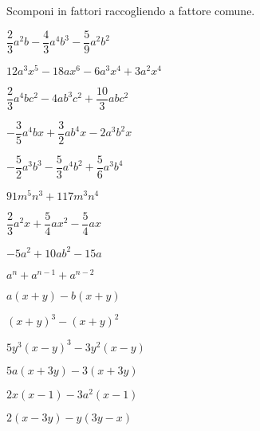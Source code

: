 \begin{esercizio}
\label{ese:div.011}
Scomponi in fattori raccogliendo a fattore comune.
\begin{multicols}{2}
\begin{enumeratea}
 \item $\dfrac{2}{3}a^{2}b-\dfrac{4}{3}a^{4}b^{3}-\dfrac{5}{9}a^{2}b^{2}$
 \item $12a^{3}x^{5}-18ax^{6}-6a^{3}x^{4}+3a^{2}x^{4}$
 \item $\dfrac{2}{3}a^{4}bc^{2}-4ab^{3}c^{2}+\dfrac{10}{3}abc^{2}$
 \item $-{\dfrac{3}{5}}a^{4}bx+\dfrac{3}{2}ab^{4}x-2a^{3}b^{2}x$
 \item $-{\dfrac{5}{2}}a^{3}b^{3}-\dfrac{5}{3}a^{4}b^{2}+\dfrac{5}{6}a^{3}b^{4}$
 \item $91m^{5}n^{3}+117m^{3}n^{4}$
 \item $\dfrac{2}{3}a^{2}x+\dfrac{5}{4}ax^{2}-\dfrac{5}{4}ax$
 \item $-5a^{2}+10ab^{2}-15a$
 \item $a^{n}+a^{n-1}+a^{n-2}$
 \item $a(x+y)-b(x+y)$
 \item $(x+y)^{3}-(x+y)^{2}$
 \item $5y^{3}(x-y)^{3}-3y^{2}(x-y)$
 \item $5a(x+3y)-3(x+3y)$
 \item $2x(x-1)-3a^{2}(x-1)$
 \item $2(x-3y)-y(3y-x)$
\end{enumeratea}
\end{multicols}
\end{esercizio}


